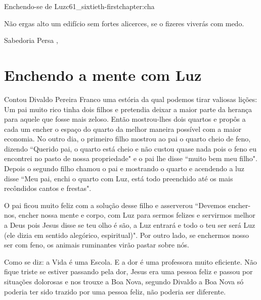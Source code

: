 \begin{chapterpage}{Enchendo-se de Luz}{c61_sixtieth-firstchapter:cha}
 
\begin{myquotation}Não ergas alto um edifício sem fortes alicerces, se o fizeres viverás com medo.
\par\vspace*{15mm}
\mbox{}\hfill \emdash{}Sabedoria Persa
, %
\par\end{myquotation}

\end{chapterpage}



\section{Enchendo a mente com Luz}\label{c1_basicformatting:sec}

\emdash{}Contou Divaldo Pereira Franco uma estória da qual podemos tirar valiosas lições: Um pai muito rico tinha dois filhos e pretendia deixar a maior parte da herança para aquele que fosse mais zeloso. Então mostrou-lhes dois quartos e propôs a cada um encher o espaço do quarto da melhor maneira possível com a maior economia. No outro dia, o primeiro filho mostrou ao pai o quarto cheio de feno, dizendo ``Querido pai, o quarto está cheio e não custou quase nada pois o feno eu encontrei no pasto de nossa propriedade" e o pai lhe disse ``muito bem meu filho". Depois o segundo filho chamou o pai e mostrando o quarto e acendendo a luz disse ``Meu pai, enchi o quarto com Luz, está todo preenchido até os mais recôndidos cantos e frestas".

\emdash{}O pai ficou muito feliz com a solução desse filho e asserverou ``Devemos encher-nos, encher nossa mente e corpo, com Luz para sermos felizes e servirmos melhor a Deus pois Jesus disse se teu olho é são, a Luz entrará e todo o teu ser será Luz (ele dizia em sentido alegórico, espiritual)". Por outro lado, se enchermos nosso ser com feno, os animais ruminantes virão pastar sobre nós.

\emdash{}Como se diz: a Vida é uma Escola. E a dor é uma professora muito eficiente. Não fique triste se estiver passando pela dor, Jesus era uma pessoa feliz e passou por situações dolorosas e nos trouxe a Boa Nova, segundo Divaldo a Boa Nova só poderia ter sido trazido por uma pessoa feliz, não poderia ser diferente.

